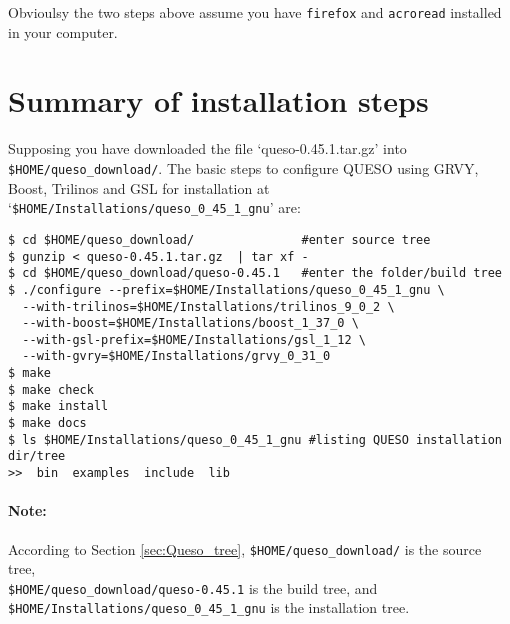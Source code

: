 Obvioulsy the two steps above assume you have \verb+firefox+ and \verb+acroread+ installed in your computer.
\section{Summary of installation steps}


Supposing you have downloaded the file `queso-0.45.1.tar.gz' into \texttt{\$HOME/queso\_download/}.
%
The basic steps to configure QUESO using GRVY, Boost, Trilinos and GSL for installation at `\verb+$HOME/Installations/queso_0_45_1_gnu+'  are:

\begin{lstlisting}
$ cd $HOME/queso_download/               #enter source tree
$ gunzip < queso-0.45.1.tar.gz  | tar xf -
$ cd $HOME/queso_download/queso-0.45.1   #enter the folder/build tree 
$ ./configure --prefix=$HOME/Installations/queso_0_45_1_gnu \
  --with-trilinos=$HOME/Installations/trilinos_9_0_2 \
  --with-boost=$HOME/Installations/boost_1_37_0 \
  --with-gsl-prefix=$HOME/Installations/gsl_1_12 \
  --with-gvry=$HOME/Installations/grvy_0_31_0 
$ make 
$ make check
$ make install 
$ make docs
$ ls $HOME/Installations/queso_0_45_1_gnu #listing QUESO installation dir/tree
>>  bin  examples  include  lib
\end{lstlisting}

\paragraph*{Note:} According to  Section \ref{sec:Queso_tree}, \texttt{\$HOME/queso\_download/} is the source tree, \\ \verb+$HOME/queso_download/queso-0.45.1+ is the build tree, and \newline
\verb+$HOME/Installations/queso_0_45_1_gnu+ is the installation tree.




